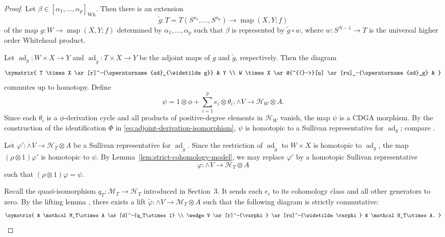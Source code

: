 \documentclass[a4paper,10pt]{amsart}
\theoremstyle{definition}
\theoremstyle{remark}
\newcommand{\map}{\operatorname{map}}
\newcommand{\ad}{\operatorname{ad}}
\numberwithin{equation}{section}
\begin{document}
\begin{proof}
Let
$
\beta\in[\alpha_1,\ldots,\alpha_p]_{\mathrm{Wh}}.
$
Then there is an extension
\[
\widetilde g:
T=T(S^{n_1},\ldots,S^{n_p})
\longrightarrow
\map(X,Y;f)
\]
of the map
$
g:W\to \map(X,Y;f)
$
determined by $\alpha_1,\ldots,\alpha_p$ such that $\beta$ is represented by $\widetilde g\circ w$, where $w:S^{N-1}\to T$ is the universal higher order Whitehead product.

Let
$
\ad_g:W\times X\to Y
$
and
$
\ad_{\widetilde g}:T\times X\to Y
$
be the adjoint maps of $g$ and $\widetilde g$, respectively. Then the diagram
\[
\xymatrix{
T \times X \ar[r]^-{\ad_{\widetilde g}} & Y \\
W \times X \ar@{^{(}->}[u] \ar[ru]_-{\ad_g} &
}
\]
commutes up to homotopy.
Define
\[
\psi
=
1\otimes\phi
+
\sum_{i=1}^p e_i\otimes\theta_i
:
\wedge V \longrightarrow  \mathcal H_W\otimes A.
\]
Since each $\theta_i$ is a $\phi$-derivation cycle and all products of
positive-degree elements in $\mathcal H_W$ vanish, the map $\psi$ is a CDGA
morphism. By the construction of the identification $\Phi$ in
\eqref{eq:adjoint-derivation-isomorphism}, $\psi$ is homotopic to a Sullivan
representative for $\ad_g$; compare \cite[Section~2]{Na2014}.

Let
$
\varphi':\wedge V\to \mathcal H_T\otimes A
$
be a Sullivan representative for $\ad_{\widetilde g}$. Since the restriction of
$\ad_{\widetilde g}$ to $W\times X$ is homotopic to $\ad_g$, the map
$
(\rho\otimes 1)\varphi'
$
is homotopic to $\psi$. By Lemma~\ref{lem:strict-cohomology-model}, we may
replace $\varphi'$ by a homotopic Sullivan representative
\[
\varphi:\wedge V\longrightarrow \mathcal H_T\otimes A
\]
such that
$
(\rho\otimes 1)\varphi=\psi.
$

Recall the quasi-isomorphism
$q_T:\mathcal M_T\to\mathcal H_T$
introduced in Section~3. It sends each $e_i$ to its cohomology class and all
other generators to zero.
By the lifting lemma
\cite[Lemma~12.4]{FHT}, there exists a lift
$
\widetilde\varphi:\wedge V\to \mathcal M_T\otimes A
$
such that the following diagram is strictly commutative:
\[
\xymatrix{
& \mathcal M_T\otimes A \ar[d]^-{q_T\otimes 1} \\
\wedge V \ar[r]^-{\varphi} \ar[ru]^-{\widetilde\varphi}
& \mathcal H_T\otimes A.
}
\]


\end{proof}
\end{document}
